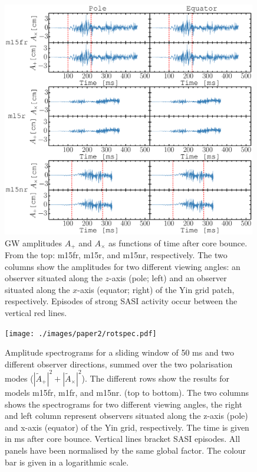 \begin{figure}           
\centering                            
\includegraphics[width=0.99\textwidth]{./images/paper2/amps.pdf}
\caption{GW amplitudes $A_+$ and $A_\times$ as functions of time after core bounce.
  From the top: m15fr, m15r, and m15nr, respectively. 
  The two columns show the amplitudes for two different viewing angles: an observer
  situated along the $z$-axis (pole; left) and an observer situated along the $x$-axis (equator; right) of the Yin grid patch, respectively.
  Episodes of strong SASI activity occur between the vertical red lines.  \label{figp2:amps}}
\end{figure}
\begin{figure}
\centering                            
\texttt{[image: ./images/paper2/rotspec.pdf]}
\caption{Amplitude spectrograms for a sliding window of 50 ms and two different observer
  directions, summed over the two polarisation modes 
  ($|\widetilde{A}_+|^2 + |\widetilde{A}_\times|^2$). The
  different rows show the results for models m15fr, m1fr, and m15nr. (top to bottom).
  The two columns shows the spectrograms for two different viewing angles, the right and left column represent
  observers situated along the z-axis (pole) and x-axis (equator) of the Yin grid, respectively.
  The time is given in ms after core bounce. Vertical lines bracket SASI episodes. All panels have been normalised by the same global factor.
  The colour bar is given in a logarithmic scale. \label{figp2:spec}}
\end{figure}



